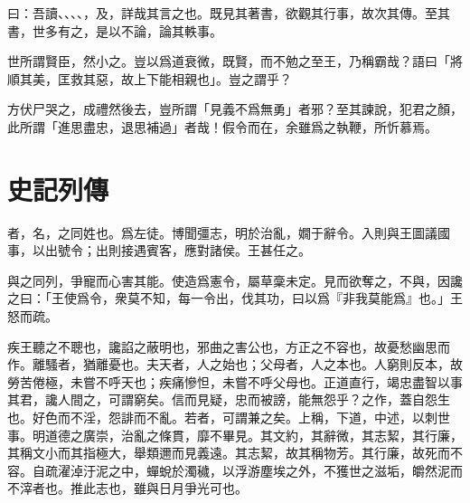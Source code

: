 曰：吾讀、、、、，及，詳哉其言之也。既見其著書，欲觀其行事，故次其傳。至其書，世多有之，是以不論，論其軼事。

世所謂賢臣，然小之。豈以爲道衰微，既賢，而不勉之至王，乃稱霸哉？語曰「將順其美，匡救其惡，故上下能相親也」。豈之謂乎？

方伏尸哭之，成禮然後去，豈所謂「見義不爲無勇」者邪？至其諫說，犯君之顏，此所謂「進思盡忠，退思補過」者哉！假令而在，余雖爲之執鞭，所忻慕焉。

\section[屈原列傳\quad{\small 史記}]{{\normalsize 史記}\quad{}列傳}
者，名，之同姓也。爲左徒。博聞彊志，明於治亂，嫺于辭令。入則與王圖議國事，以出號令；出則接遇賓客，應對諸侯。王甚任之。

與之同列，爭寵而心害其能。使造爲憲令，屬草稾未定。見而欲奪之，不與，因讒之曰：「王使爲令，衆莫不知，每一令出，伐其功，曰以爲『非我莫能爲』也。」王怒而疏。

疾王聽之不聰也，讒諂之蔽明也，邪曲之害公也，方正之不容也，故憂愁幽思而作。離騷者，猶離憂也。夫天者，人之始也；父母者，人之本也。人窮則反本，故勞苦倦極，未嘗不呼天也；疾痛慘怛，未嘗不呼父母也。正道直行，竭忠盡智以事其君，讒人間之，可謂窮矣。信而見疑，忠而被謗，能無怨乎？之作，蓋自怨生也。好色而不淫，怨誹而不亂。若者，可謂兼之矣。上稱，下道，中述，以刺世事。明道德之廣崇，治亂之條貫，靡不畢見。其文約，其辭微，其志絜，其行廉，其稱文小而其指極大，舉類邇而見義遠。其志絜，故其稱物芳。其行廉，故死而不容。自疏濯淖汙泥之中，蟬蛻於濁穢，以浮游塵埃之外，不獲世之滋垢，皭然泥而不滓者也。推此志也，雖與日月爭光可也。

